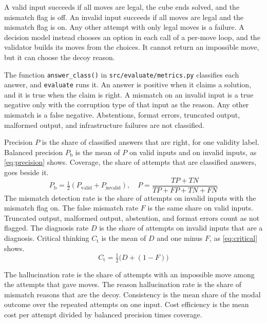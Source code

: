 \documentclass[10pt,twocolumn,letterpaper]{article}
\newcommand{\code}[1]{\texttt{#1}}
\begin{document}
A valid input succeeds if all moves are legal, the cube ends solved, and the mismatch flag is off. An invalid input succeeds if all moves are legal and the mismatch flag is on. Any other attempt with only legal moves is a failure. A decision model instead chooses an option in each call of a per-move loop, and the validator builds its moves from the choices. It cannot return an impossible move, but it can choose the decoy reason.

The function \code{answer\_class()} in \code{src/evaluate/metrics.py} classifies each answer, and \code{evaluate} runs it. An answer is positive when it claims a solution, and it is true when the claim is right. A mismatch on an invalid input is a true negative only with the corruption type of that input as the reason. Any other mismatch is a false negative. Abstentions, format errors, truncated output, malformed output, and infrastructure failures are not classified.

Precision $P$ is the share of classified answers that are right, for one validity label. Balanced precision $P_{\mathrm{b}}$ is the mean of $P$ on valid inputs and on invalid inputs, as \cref{eq:precision} shows. Coverage, the share of attempts that are classified answers, goes beside it.
\begin{equation}
P_{\mathrm{b}} = \tfrac{1}{2}\left(P_{\mathrm{valid}} + P_{\mathrm{invalid}}\right), \quad P = \frac{TP+TN}{TP+FP+TN+FN}
\label{eq:precision}
\end{equation}
The mismatch detection rate is the share of attempts on invalid inputs with the mismatch flag on. The false mismatch rate $F$ is the same share on valid inputs. Truncated output, malformed output, abstention, and format errors count as not flagged. The diagnosis rate $D$ is the share of attempts on invalid inputs that are a diagnosis. Critical thinking $C_{\mathrm{t}}$ is the mean of $D$ and one minus $F$, as \cref{eq:critical} shows.
\begin{equation}
C_{\mathrm{t}} = \tfrac{1}{2}\bigl(D + (1 - F)\bigr)
\label{eq:critical}
\end{equation}

The hallucination rate is the share of attempts with an impossible move among the attempts that gave moves. The reason hallucination rate is the share of mismatch reasons that are the decoy. Consistency is the mean share of the modal outcome over the repeated attempts on one input. Cost efficiency is the mean cost per attempt divided by balanced precision times coverage.
\end{document}
